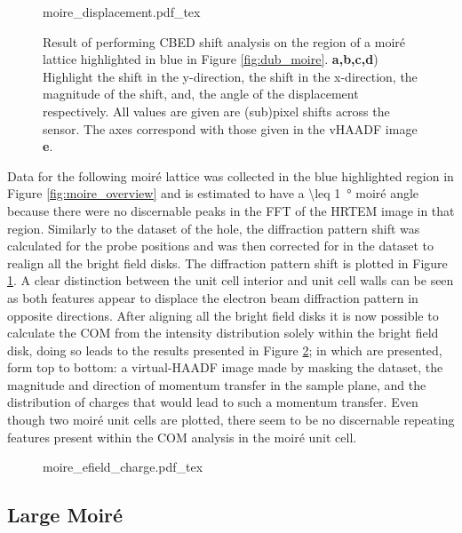 \begin{figure}
    \centering
    \def\svgwidth{.95\linewidth}
    {moire_displacement.pdf_tex}
    \caption{Result of performing CBED shift analysis on the region of a moiré lattice highlighted in blue in Figure \ref{fig:dub_moire}. \textbf{a,b,c,d}) Highlight the shift in the y-direction, the shift in the x-direction, the magnitude of the shift, and, the angle of the displacement respectively. All values are given are (sub)pixel shifts across the sensor. The axes correspond with those given in the vHAADF image \textbf{e}.}
    \label{fig:m_dis}
\end{figure}

Data for the following moiré lattice was collected in the blue highlighted region in Figure \ref{fig:moire_overview} and is estimated to have a \SI{\leq 1}{\degree} moiré angle because there were no discernable peaks in the FFT of the HRTEM image in that region. Similarly to the dataset of the hole, the diffraction pattern shift was calculated for the probe positions and was then corrected for in the dataset to realign all the bright field disks. The diffraction pattern shift is plotted in Figure \ref{fig:m_dis}. A clear distinction between the unit cell interior and unit cell walls can be seen as both features appear to displace the electron beam diffraction pattern in opposite directions. After aligning all the bright field disks it is now possible to calculate the COM from the intensity distribution solely within the bright field disk, doing so leads to the results presented in Figure \ref{fig:m_mom}; in which are presented, form top to bottom: a virtual-HAADF image made by masking the dataset, the magnitude and direction of momentum transfer in the sample plane, and the distribution of charges that would lead to such a momentum transfer. Even though two moiré unit cells are plotted, there seem to be no discernable repeating features present within the COM analysis in the moiré unit cell.

\begin{figure}
    \centering
    \def\svgwidth{.5\linewidth}
    {moire_efield_charge.pdf_tex}
    \caption{}
    \label{fig:m_mom}
\end{figure}

\subsection{Large Moiré}

